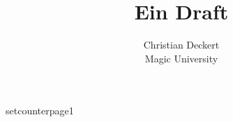 \documentclass{article}
\begin{document}
\title{Ein Draft}
\date{}
\author{Christian Deckert \\Magic University}
\maketitle
\newpage
\tableofcontents
\newpage
setcounter{page}{1}





\end{document}
